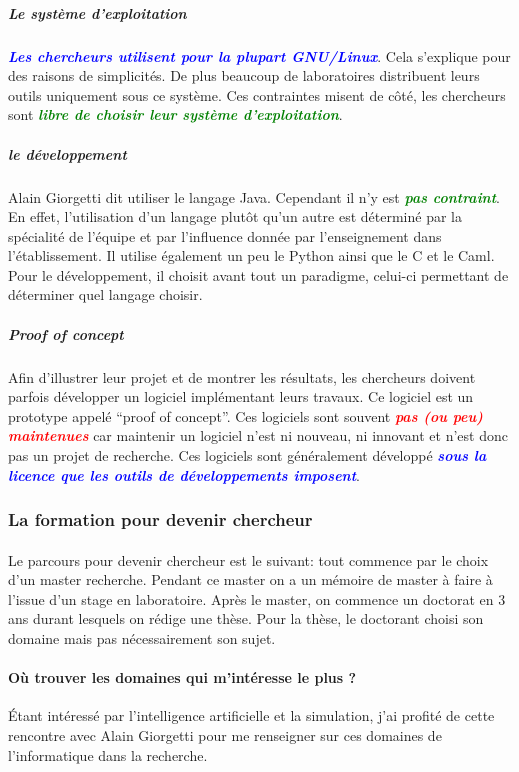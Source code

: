 \documentclass[a4paper,12pt, draft]{report}
\newcommand{\goodPoint}[1]{\textcolor{green}{\textbf{\textit{#1}}}}
\newcommand{\badPoint}[1]{\textcolor{red}{\textbf{\textit{#1}}}}
\newcommand{\importantPoint}[1]{\textcolor{blue}{\textbf{\textit{#1}}}}
\begin{document}
\subparagraph{Le système d'exploitation}
\importantPoint{Les chercheurs utilisent pour la plupart GNU/Linux}. Cela s'explique pour des raisons de simplicités. De plus beaucoup de laboratoires distribuent leurs outils uniquement sous ce système. Ces contraintes misent de côté, les chercheurs sont \goodPoint{libre de choisir leur système d'exploitation}.

\subparagraph{le développement}
Alain Giorgetti dit utiliser le langage Java. Cependant il n'y est \goodPoint{pas contraint}. En effet, l'utilisation d'un langage plutôt qu'un autre est déterminé par la spécialité de l'équipe et par l'influence donnée par l'enseignement dans l'établissement. Il utilise également un peu le Python ainsi que le C et le Caml.
Pour le développement, il choisit avant tout un paradigme, celui-ci permettant de déterminer quel langage choisir.

\subparagraph{Proof of concept}
Afin d'illustrer leur projet et de montrer les résultats, les chercheurs doivent parfois développer un logiciel implémentant leurs travaux. Ce logiciel est un prototype appelé ``proof of concept''. Ces logiciels sont souvent \badPoint{pas (ou peu) maintenues} car maintenir un logiciel n'est ni nouveau, ni innovant et n'est donc pas un projet de recherche. Ces logiciels sont généralement développé \importantPoint{sous la licence que les outils de développements imposent}.

\subsubsection{La formation pour devenir chercheur}
\paragraph{}
Le parcours pour devenir chercheur est le suivant:
tout commence par le choix d'un master recherche. Pendant ce master on a un mémoire de master à faire à l'issue d'un stage en laboratoire.
Après le master, on commence un doctorat en 3 ans durant lesquels on rédige une thèse. Pour la thèse, le doctorant choisi son domaine mais pas nécessairement son sujet.

\paragraph{Où trouver les domaines qui m'intéresse le plus ?}
Étant intéressé par l'intelligence artificielle et la simulation, j'ai profité de cette rencontre avec Alain Giorgetti pour me renseigner sur ces domaines de l'informatique dans la recherche.
\end{document}
